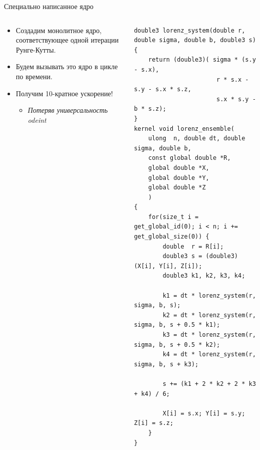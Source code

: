 \documentclass[@BEAMER_OPTIONS@]{beamer}
\begin{document}
\begin{frame}[fragile]{Специально написанное ядро}
    \begin{columns}
        \begin{column}{0.45\textwidth}
            \begin{itemize}
                \item Создадим монолитное ядро, соответствующее одной итерации
                    Рунге-Кутты.
                \item Будем вызывать это ядро в цикле по времени.
                    \vspace{\baselineskip}
                \item Получим 10-кратное ускорение!
                    \begin{itemize}
                        \item<2|alert@2> \emph{Потеряв универсальность odeint}
                    \end{itemize}
            \end{itemize}
        \end{column} \quad \quad
        \begin{column}{0.5\textwidth}
            \begin{exampleblock}{}
                \begin{adjustbox}{width=0.95\textwidth,height=0.95\textheight,keepaspectratio}
                    \begin{lstlisting}
double3 lorenz_system(double r, double sigma, double b, double3 s) {
    return (double3)( sigma * (s.y - s.x),
                       r * s.x - s.y - s.x * s.z,
                       s.x * s.y - b * s.z);
}
kernel void lorenz_ensemble(
    ulong  n, double dt, double sigma, double b,
    const global double *R,
    global double *X,
    global double *Y,
    global double *Z
    )
{
    for(size_t i = get_global_id(0); i < n; i += get_global_size(0)) {
        double  r = R[i];
        double3 s = (double3)(X[i], Y[i], Z[i]);
        double3 k1, k2, k3, k4;

        k1 = dt * lorenz_system(r, sigma, b, s);
        k2 = dt * lorenz_system(r, sigma, b, s + 0.5 * k1);
        k3 = dt * lorenz_system(r, sigma, b, s + 0.5 * k2);
        k4 = dt * lorenz_system(r, sigma, b, s + k3);

        s += (k1 + 2 * k2 + 2 * k3 + k4) / 6;

        X[i] = s.x; Y[i] = s.y; Z[i] = s.z;
    }
}
                    \end{lstlisting}
                \end{adjustbox}
            \end{exampleblock}
        \end{column}
    \end{columns}
\end{frame}
\end{document}
